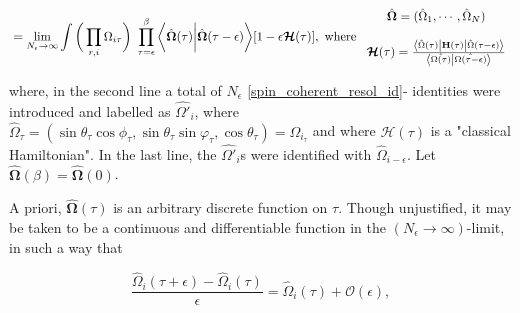 \begin{equation}
\begin{split}
    &= \lim_{N_{\epsilon} \rightarrow \infty} \int \bigg( \prod_{r, i} {{\Omega}}_{i \tau} \bigg) \textnormal{ } \prod_{\tau = \epsilon}^{\beta} \bigg\langle \hat{\bm{\Omega}}(\tau) \bigg| \hat{\bm{\Omega}}(\tau - \epsilon) \bigg\rangle [1 - \epsilon \bm{\mathcal{H}}(\tau)], \textnormal{ where } \begin{array}{cc}
         \hat{\bm{\Omega}} = (\hat{{\Omega}}_1, \cdots, \hat{{\Omega}}_N)  \\
         \\
         \bm{\mathcal{H}}(\tau) = \frac{\bra{\hat{\Omega}(\tau)} {{\bf H}}(\tau) \ket{\hat{\Omega}(\tau - \epsilon)}}{\bra{\hat{\Omega(\tau)}} \ket{\hat{\Omega(\tau - \epsilon)}}}
    \end{array} \\
    \label{generating_function_and_cl_hammiltonian}
\end{split}
\end{equation}

where, in the second line a total of $N_{\epsilon}$ \cref{spin_coherent_resol_id}-
identities were introduced and labelled as 
$\hat{\Omega'}_{i}$, where $\hat{\Omega}_{\tau} 
= (\sin \theta_{\tau} \cos \phi_{\tau}, \sin 
\theta_{\tau} \sin \varphi_{\tau}, \cos 
\theta_{\tau}) = \Omega_i_\tau$ and where 
$\bm{\mathcal{H}}(\tau)$ is a "classical 
Hamiltonian". In the last line, the 
$\hat{\Omega'}_{i}$s were identified with 
$\hat{\Omega}_{i-\epsilon}$. Let 
$\hat{\bm{\Omega}}(\beta) = 
\hat{\bm{\Omega}}(0)$. \bigbreak

A priori, $\hat{\bm{\Omega}}(\tau)$ is an arbitrary discrete function on $\tau$. Though unjustified, it may be taken to be a continuous and differentiable function in the $(N_{\epsilon}\rightarrow\infty)$-limit, in such a way that 

\begin{equation}
    \frac{\hat{{\Omega}}_i(\tau + \epsilon) - \hat{{\Omega}}_i(\tau)}{\epsilon} = \hat{{\Omega}}_i(\tau) + \mathcal{O}(\epsilon),
\end{equation}

